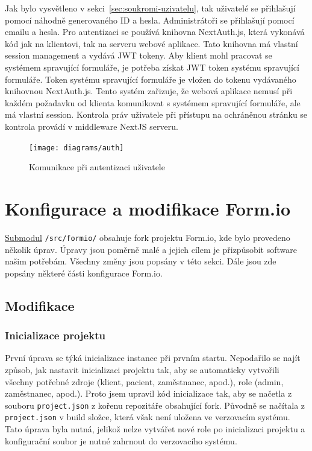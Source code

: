 Jak bylo vysvětleno v sekci~\ref{sec:soukromi-uzivatelu}, tak uživatelé se přihlašují pomocí náhodně generovaného ID a hesla.
Administrátoři se přihlašují pomocí emailu a hesla.
Pro autentizaci se používá knihovna NextAuth.js, která vykonává kód jak na klientovi, tak na serveru webové aplikace.
Tato knihovna má vlastní session management a vydává JWT tokeny.
Aby klient mohl pracovat se systémem spravující formuláře, je potřeba získat JWT token systému spravující formuláře.
Token systému spravující formuláře je vložen do tokenu vydávaného knihovnou NextAuth.js.
Tento systém zařizuje, že webová aplikace nemusí při každém požadavku od klienta komunikovat s systémem spravující formuláře, ale má vlastní session.
Kontrola práv uživatele při přístupu na ochráněnou stránku se kontrola provádí v middleware NextJS serveru.

\begin{figure}[H]
    \centering
    \texttt{[image: diagrams/auth]}
    \caption{Komunikace při autentizaci uživatele}\label{fig:auth}
\end{figure}


\section{Konfigurace a modifikace Form.io}\label{sec:konfigurace-a-modifikace-form.io}

\href{https://git-scm.com/book/en/v2/Git-Tools-Submodules}{Submodul} \lstinline{/src/formio/} obsahuje fork projektu Form.io, kde bylo provedeno několik úprav.
Úpravy jsou poměrně malé a jejich cílem je přizpůsobit software našim potřebám.
Všechny změny jsou popsány v této sekci.
Dále jsou zde popsány některé části konfigurace Form.io.

\subsection{Modifikace}\label{subsec:modifikace}

\subsubsection{Inicializace projektu}\label{subsubsec:inicializace-projektu}

První úprava se týká inicializace instance při prvním startu.
Nepodařilo se najít způsob, jak nastavit inicializaci projektu tak, aby se automaticky vytvořili všechny potřebné zdroje (klient, pacient, zaměstnanec, apod.), role (admin, zaměstnanec, apod.).
Proto jsem upravil kód inicializace tak, aby se načetla z souboru \lstinline{project.json} z kořenu repozitáře obsahující fork.
Původně se načítala z \lstinline{project.json} v build složce, která však není uložena ve verzovacím systému.
Tato úprava byla nutná, jelikož nelze vytvářet nové role po inicializaci projektu a konfigurační soubor je nutné zahrnout do verzovacího systému.

